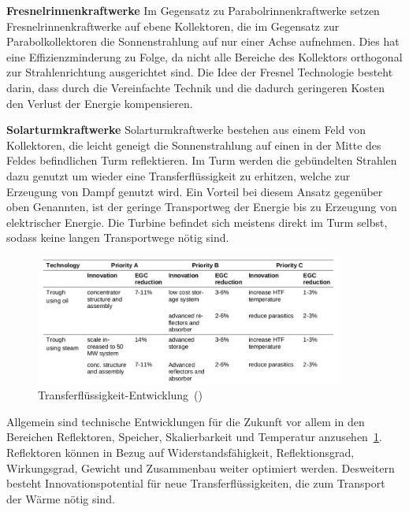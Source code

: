 \textbf{Fresnelrinnenkraftwerke} 
\newline
Im Gegensatz zu Parabolrinnenkraftwerke setzen Fresnelrinnenkraftwerke auf ebene Kollektoren, die im Gegensatz zur Parabolkollektoren die Sonnenstrahlung auf nur einer Achse aufnehmen. Dies hat eine Effizienzminderung zu Folge, da nicht alle Bereiche des Kollektors orthogonal zur Strahlenrichtung ausgerichtet sind. Die Idee der Fresnel Technologie besteht darin, dass durch die Vereinfachte Technik und die dadurch geringeren Kosten den Verlust der Energie kompensieren.
\cite{viebahn2008}

\textbf{Solarturmkraftwerke}
\newline
Solarturmkraftwerke bestehen aus einem Feld von  Kollektoren, die leicht geneigt die Sonnenstrahlung auf einen in der Mitte des Feldes befindlichen Turm reflektieren. Im Turm werden die gebündelten Strahlen dazu genutzt um wieder eine Transferflüssigkeit zu erhitzen, welche zur Erzeugung von Dampf genutzt wird. Ein Vorteil bei diesem Ansatz gegenüber oben Genannten, ist der geringe Transportweg der Energie bis zu Erzeugung von elektrischer Energie. Die Turbine befindet sich meistens direkt im Turm selbst, sodass keine langen Transportwege nötig sind.
\cite{viebahn2008}

\begin{figure}[H]
	\centering
	\includegraphics[width=0.9\textwidth,trim=1 1 1 1,clip]{technische_entwicklung1.png}
	\caption{Transferflüssigkeit-Entwicklung~(\cite{viebahn2011})}
	\label{fig:technik_e1}
\end{figure}

Allgemein sind technische Entwicklungen für die Zukunft vor allem in den Bereichen Reflektoren, Speicher, Skalierbarkeit und Temperatur anzusehen~\ref{fig:technik_e1}.
\newline
Reflektoren können in Bezug auf Widerstandsfähigkeit, Reflektionsgrad, Wirkungsgrad, Gewicht und Zusammenbau weiter optimiert werden. Desweitern besteht Innovationspotential für neue Transferflüssigkeiten, die zum Transport der Wärme nötig sind.

